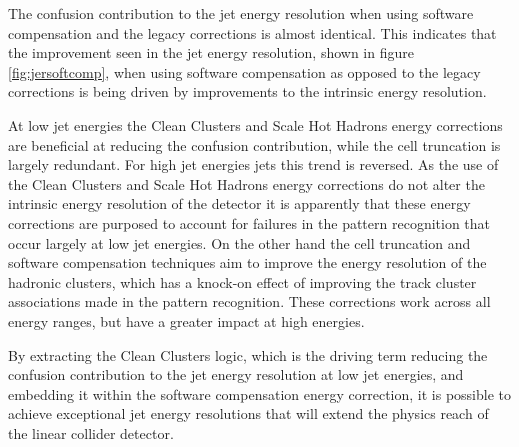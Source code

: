 The confusion contribution to the jet energy resolution when using software compensation and the legacy corrections is almost identical.  This indicates that the improvement seen in the jet energy resolution, shown in figure \ref{fig:jersoftcomp}, when using software compensation as opposed to the legacy corrections is being driven by improvements to the intrinsic energy resolution.  

At low jet energies the Clean Clusters and Scale Hot Hadrons energy corrections are beneficial at reducing the confusion contribution, while the cell truncation is largely redundant.  For high jet energies jets this trend is reversed.  As the use of the Clean Clusters and Scale Hot Hadrons energy corrections do not alter the intrinsic energy resolution of the detector it is apparently that these energy corrections are purposed to account for failures in the pattern recognition that occur largely at low jet energies.  On the other hand the cell truncation and software compensation techniques aim to improve the energy resolution of the hadronic clusters, which has a knock-on effect of improving the track cluster associations made in the pattern recognition.  These corrections work across all energy ranges, but have a greater impact at high energies.  

By extracting the Clean Clusters logic, which is the driving term reducing the confusion contribution to the jet energy resolution at low jet energies, and embedding it within the software compensation energy correction, it is possible to achieve exceptional jet energy resolutions that will extend the physics reach of the linear collider detector.  

